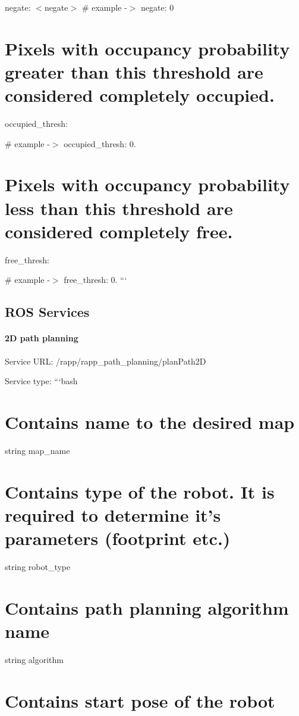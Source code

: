 negate\-: $<$negate$>$ \# example -\/$>$ negate\-: 0

\section*{Pixels with occupancy probability greater than this threshold are considered completely occupied.}

occupied\-\_\-thresh\-: 

\# example -\/$>$ occupied\-\_\-thresh\-: 0.

\section*{Pixels with occupancy probability less than this threshold are considered completely free.}

free\-\_\-thresh\-: 

\# example -\/$>$ free\-\_\-thresh\-: 0. ``` \subsection*{R\-O\-S Services}

\paragraph*{2\-D path planning}

Service U\-R\-L\-: {\ttfamily /rapp/rapp\-\_\-path\-\_\-planning/plan\-Path2\-D}

Service type\-: ```bash \section*{Contains name to the desired map}

string map\-\_\-name \section*{Contains type of the robot. It is required to determine it's parameters (footprint etc.)}

string robot\-\_\-type \section*{Contains path planning algorithm name}

string algorithm \section*{Contains start pose of the robot}

